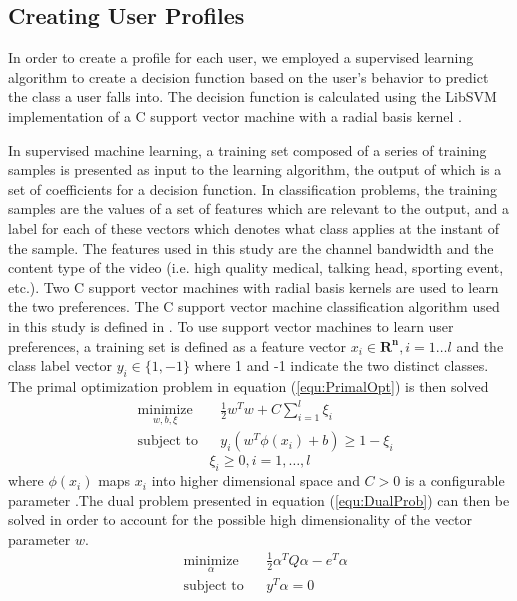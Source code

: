 \subsection{Creating User Profiles}
In order to create a profile for each user, we employed a supervised learning algorithm to create a decision function based on the user’s behavior to predict the class a user falls into. The decision function is calculated using the LibSVM implementation of a C support vector machine with a radial basis kernel \cite{LibSVM}.

In supervised machine learning, a training set composed of a series of training samples is presented as input to the learning algorithm, the output of which is a set of coefficients for a decision function. In classification problems, the training samples are the values of a set of features which are relevant to the output, and a label for each of these vectors which denotes what class applies at the instant of the sample. The features used in this study are the channel bandwidth and the content type of the video (i.e. high quality medical, talking head, sporting event, etc.). Two C support vector machines with radial basis kernels are used to learn the two preferences. The C support vector machine classification algorithm used in this study is defined in \cite{LibSVM}. To use support vector machines to learn user preferences, a training set is defined as a feature vector $x_i \in \mathbf{R^n}  ,i=1\ldots{l}$ and the class label vector $y_i \in \lbrace 1,-1 \rbrace $ where 1 and -1 indicate the two distinct classes. The primal optimization problem in equation (\ref{equ:PrimalOpt}) is then solved \cite{LibSVM}
\begin{equation}
\begin{aligned}
\label{equ:PrimalOpt}
& \underset{w,b,\xi}{\text{minimize}}
& & \frac{1}{2}w^Tw+C\sum_{i=1}^{l} \xi_i \\
& \text{subject to}
& &  y_i(w^T\phi(x_i) + b) \ge 1 - \xi_i
\end{aligned}
\end{equation}
\[ \xi_i \ge 0, i = 1,\ldots ,l \]
where $\phi (x_i)$ maps $x_i$ into higher dimensional space and $C > 0$ is a configurable parameter \cite{LibSVM}.The dual problem presented in equation (\ref{equ:DualProb}) can then be solved in order to account for the possible high dimensionality of the vector parameter $w$.
\begin{equation}
\begin{aligned}
\label{equ:DualProb}
& \underset{\alpha}{\text{minimize}}
& & \frac{1}{2}\alpha^TQ\alpha-e^T\alpha \\
& \text{subject to}
& &  y^T\alpha = 0
\end{aligned}
\end{equation}
